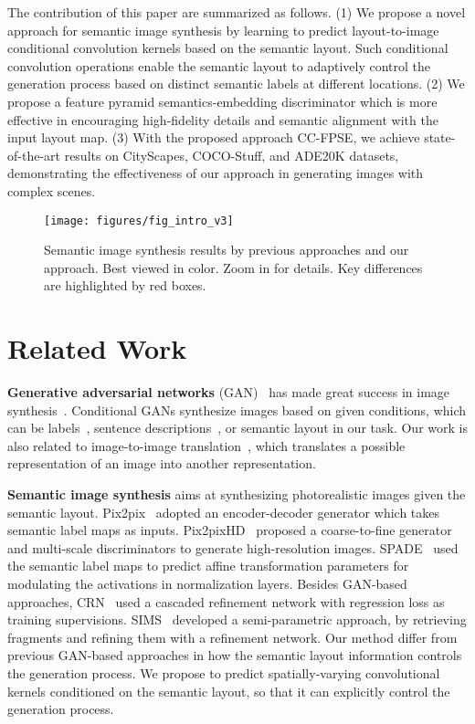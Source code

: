 \documentclass{article}
\begin{document}
The contribution of this paper are summarized as follows.
(1) We propose a novel approach for semantic image synthesis by learning to predict layout-to-image conditional convolution kernels based on the semantic layout. 
Such conditional convolution operations enable the semantic layout to adaptively control the generation process based on distinct semantic labels at different locations.
(2) We propose a feature pyramid semantics-embedding discriminator which is more effective in encouraging high-fidelity details and semantic alignment with the input layout
map.
(3) With the proposed approach CC-FPSE, we achieve state-of-the-art results on CityScapes, COCO-Stuff, and ADE20K datasets, demonstrating the effectiveness of our approach in generating images with complex scenes.


\begin{figure}[t]
\centering
\texttt{[image: figures/fig\_intro\_v3]}
\caption{Semantic image synthesis results by previous approaches and our approach. Best viewed in color. Zoom in for details. Key differences are highlighted by red boxes.}
\label{fig:pipeline}
\end{figure}

\section{Related Work}


\noindent\textbf{Generative adversarial networks} (GAN)~\cite{goodfellow2014gan} has made great success in image synthesis~\cite{brock2018large,karras2018style,lucic2019high}. 
Conditional GANs synthesize images based on given conditions, which can be labels~\cite{zhang2018self,brock2018large}, sentence descriptions~\cite{zhang2017stackgan,xu2017attngan}, or semantic layout in our task.
Our work is also related to image-to-image translation~\cite{isola2017image,liu2017unsupervised}, which translates a possible representation of an image into another representation.

\noindent\textbf{Semantic image synthesis} aims at synthesizing photorealistic images given the semantic layout.
Pix2pix~\cite{isola2017image} adopted an encoder-decoder generator which takes semantic label maps as inputs.
Pix2pixHD~\cite{wang2018high} proposed a coarse-to-fine generator and multi-scale discriminators to generate high-resolution images.
SPADE~\cite{park2019semantic} used the semantic label maps to predict affine transformation parameters for modulating the activations in normalization layers.
Besides GAN-based approaches, CRN~\cite{chen2017photographic} used a cascaded refinement network with regression loss as training supervisions.
SIMS~\cite{qi2018semi} developed a semi-parametric approach, by retrieving fragments and refining them with a refinement network.
Our method differ from previous GAN-based approaches in how the semantic layout information controls the generation process.
We propose to predict spatially-varying convolutional kernels conditioned on the semantic layout, so that it can explicitly control the generation process.
\end{document}
